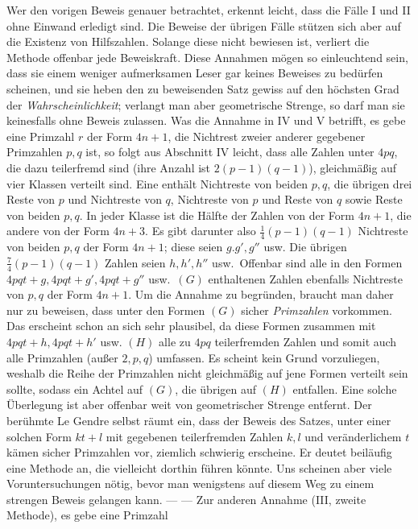 Wer den vorigen Beweis genauer betrachtet, erkennt leicht, dass
die Fälle I und II ohne Einwand erledigt sind. Die Beweise der
übrigen Fälle stützen sich aber auf die Existenz von Hilfszahlen.
Solange diese nicht bewiesen ist, verliert die Methode offenbar
jede Beweiskraft. Diese Annahmen mögen so einleuchtend sein, dass
sie einem weniger aufmerksamen Leser gar keines Beweises zu bedürfen
scheinen, und sie heben den zu beweisenden Satz gewiss auf den
höchsten Grad der \emph{Wahrscheinlichkeit}; verlangt man aber
geometrische Strenge, so darf man sie keinesfalls ohne Beweis
zulassen. Was die Annahme in IV und V betrifft, es gebe eine Primzahl
\(r\) der Form \(4n+1\), die Nichtrest zweier anderer gegebener
Primzahlen \(p,q\) ist, so folgt aus Abschnitt IV leicht, dass
alle Zahlen unter \(4pq\), die dazu teilerfremd sind (ihre Anzahl
ist \(2(p-1)(q-1)\)), gleichmäßig auf vier Klassen verteilt sind. Eine
enthält Nichtreste von beiden \(p,q\), die übrigen drei Reste
von \(p\) und Nichtreste von \(q\), Nichtreste von \(p\)
und Reste von \(q\) sowie Reste von beiden \(p,q\). In jeder
Klasse ist die Hälfte der Zahlen von der Form \(4n+1\), die andere
von der Form \(4n+3\). Es gibt darunter also \(\frac14(p-1)(q-1)\) Nichtreste
von beiden \(p,q\) der Form \(4n+1\); diese seien \(g.g',g''\) usw.
Die übrigen \(\frac74(p-1)(q-1)\) Zahlen seien \(h,h',h''\) usw.\ Offenbar sind
alle in den Formen \(4pqt+g,4pqt+g',4pqt+g''\) usw.\ \((G)\) enthaltenen Zahlen
ebenfalls Nichtreste von \(p,q\) der Form \(4n+1\). Um die Annahme
zu begründen, braucht man daher nur zu beweisen, dass unter den
Formen \((G)\) sicher \emph{Primzahlen} vorkommen. Das erscheint
schon an sich sehr plausibel, da diese Formen zusammen mit
\(4pqt+h,4pqt+h'\) usw.
\((H)\) alle zu \(4pq\) teilerfremden Zahlen und somit auch
alle Primzahlen (außer \(2,p,q\)) umfassen. Es scheint kein Grund
vorzuliegen, weshalb die Reihe der Primzahlen nicht gleichmäßig
auf jene Formen verteilt sein sollte, sodass ein Achtel auf
\((G)\), die übrigen auf \((H)\) entfallen. Eine solche Überlegung
ist aber offenbar weit von geometrischer Strenge entfernt.
Der berühmte Le Gendre selbst räumt ein, dass der Beweis des
Satzes, unter einer solchen Form \(kt+l\) mit gegebenen teilerfremden
Zahlen \(k,l\) und veränderlichem \(t\) kämen sicher Primzahlen
vor, ziemlich schwierig erscheine. Er deutet beiläufig eine
Methode an, die vielleicht dorthin führen könnte. Uns scheinen
aber viele Voruntersuchungen nötig, bevor man wenigstens auf
diesem Weg zu einem strengen Beweis gelangen kann. — — Zur
anderen Annahme (III, zweite Methode), es gebe eine Primzahl
